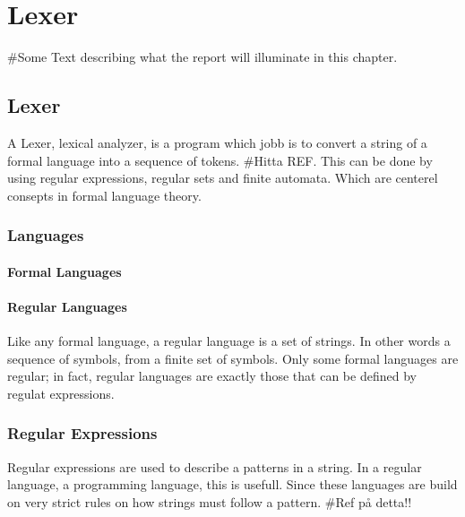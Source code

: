 \chapter{Lexer}
\#Some Text describing what the report will illuminate in this chapter.
\section{Lexer}
A Lexer, lexical analyzer, is a program which jobb is to convert a string of a
formal language into a sequence of tokens. \#Hitta REF.
This can be done by using regular expressions, regular sets and finite
automata. Which are centerel consepts in formal language theory. \cite{Aho} 
\subsection{Languages}
\subsubsection{Formal Languages}
\subsubsection{Regular Languages}
Like any formal language, a regular language is a set of strings. In other words a sequence of symbols,
from a finite set of symbols. Only some formal languages are regular; in fact, 
regular languages are exactly those that can be defined by regulat expressions.
\cite{Ranta2012}
\subsection{Regular Expressions}
Regular expressions are used to describe a patterns in a string.
In a regular language, a programming language, this is usefull.
Since these languages are build on very strict rules on how strings
must follow a pattern. \#Ref på detta!! 

